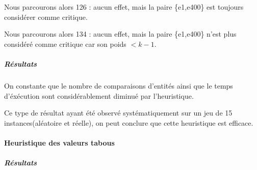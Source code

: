 Nous parcourons alors 126 : aucun effet, mais la paire \{e1,e400\} est toujours considérer comme critique.

Nous parcourons alors 134 : aucun effet, mais la paire  \{e1,e400\} n'est plus considéré comme critique car son poids $<k-1$.

\subparagraph{Résultats}
%	
%	
%
%	
%	

On constante que le nombre de comparaisons d'entités ainsi que le temps d'éxécution sont considérablement diminué par l'heuristique.

Ce type de résultat ayant été observé systématiquement sur un jeu de 15 instances(aléatoire et réelle), on peut conclure que cette heuristique est efficace.

\paragraph{Heuristique des valeurs tabous}
\subparagraph{Résultats}

%	
%	
%
%	
%	



